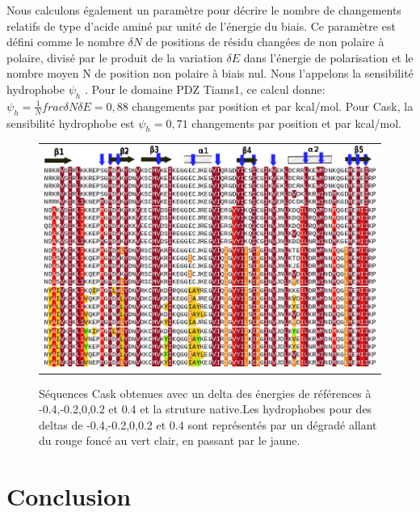     

Nous calculons également un paramètre pour décrire le nombre de changements relatifs de type d'acide aminé par unité de l'énergie du biais. Ce  paramètre est défini comme le nombre $\delta N$ de positions de résidu  changées de non polaire à polaire, divisé par le produit de la variation $\delta E$ dans l'énergie de polarisation et le nombre moyen N de position non polaire à biais nul. Nous l'appelons la sensibilité hydrophobe $\psi_h$ . Pour le domaine PDZ Tiams1, ce calcul donne:
$\psi_h = \frac{1}{N} frac{\delta N}{\delta E} = 0,88$ changements par position et par kcal/mol. Pour Cask, la sensibilité hydrophobe  est  $\psi_h = 0,71$ changements par position et par kcal/mol.


\begin{figure}[!h]
  \centering
  \begin{tabular}{c}
    \includegraphics[width=16cm]{titration/alignCASK.png} \\
  \end{tabular}
  
  \caption{\small Séquences Cask obtenues avec un delta des énergies de références à -0.4,-0.2,0,0.2 et 0.4 et la struture native.Les hydrophobes pour des deltas de -0.4,-0.2,0,0.2 et 0.4 sont représentés par un dégradé allant du rouge foncé au vert clair, en passant par le jaune.}
  \label{result:PDZ_seed}
\end{figure}




\section{Conclusion}

